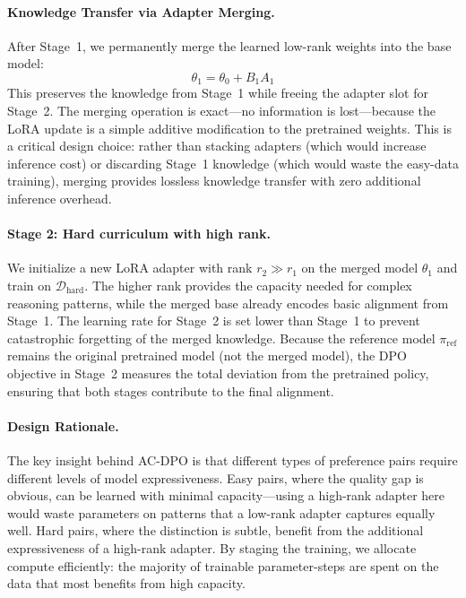 \documentclass{article}
\begin{document}
\paragraph{Knowledge Transfer via Adapter Merging.}
After Stage~1, we permanently merge the learned low-rank weights into the base model:
\begin{equation}
\theta_1 = \theta_0 + B_1 A_1
\end{equation}
This preserves the knowledge from Stage~1 while freeing the adapter slot for Stage~2. The merging operation is exact---no information is lost---because the LoRA update is a simple additive modification to the pretrained weights. This is a critical design choice: rather than stacking adapters (which would increase inference cost) or discarding Stage~1 knowledge (which would waste the easy-data training), merging provides lossless knowledge transfer with zero additional inference overhead.

\paragraph{Stage 2: Hard curriculum with high rank.}
We initialize a new LoRA adapter with rank $r_2 \gg r_1$ on the merged model $\theta_1$ and train on $\mathcal{D}_{\text{hard}}$. The higher rank provides the capacity needed for complex reasoning patterns, while the merged base already encodes basic alignment from Stage~1. The learning rate for Stage~2 is set lower than Stage~1 to prevent catastrophic forgetting of the merged knowledge. Because the reference model $\pi_{\text{ref}}$ remains the original pretrained model (not the merged model), the DPO objective in Stage~2 measures the total deviation from the pretrained policy, ensuring that both stages contribute to the final alignment.

\paragraph{Design Rationale.}
The key insight behind AC-DPO is that different types of preference pairs require different levels of model expressiveness. Easy pairs, where the quality gap is obvious, can be learned with minimal capacity---using a high-rank adapter here would waste parameters on patterns that a low-rank adapter captures equally well. Hard pairs, where the distinction is subtle, benefit from the additional expressiveness of a high-rank adapter. By staging the training, we allocate compute efficiently: the majority of trainable parameter-steps are spent on the data that most benefits from high capacity.
\end{document}
